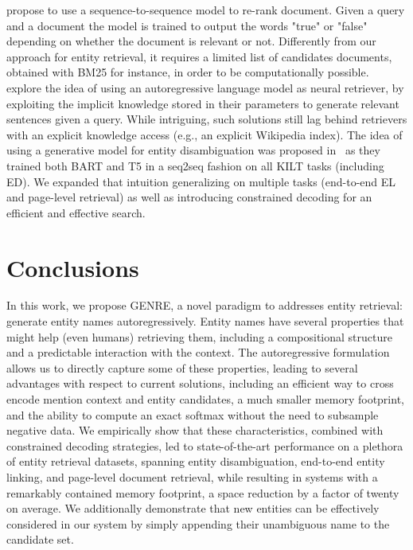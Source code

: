 \documentclass{article} \usepackage{main,times}
\makeatletter
\def\genre{\textsc{GENRE}\@\xspace}
\makeatother
\begin{document}
 \cite{nogueira2020document} propose to use a sequence-to-sequence model to re-rank document. Given a query and a document the model is trained to output the words "true" or "false" depending on whether the document is relevant or not. Differently from our approach for entity retrieval, it requires a limited list of candidates documents, obtained with BM25 for instance, in order to be computationally possible.
 \cite{massarelli2019decoding,petroni2020how} explore the idea of using an autoregressive language
model as neural retriever, by exploiting the implicit knowledge stored in their parameters to generate relevant sentences given a query. While intriguing, such solutions still lag behind retrievers with an explicit knowledge access (e.g., an explicit Wikipedia index).
The idea of using a generative model for entity disambiguation was proposed in~\citet{petroni2020kilt} as they trained both BART and T5 in a seq2seq fashion on all KILT tasks (including ED).  We expanded that intuition generalizing on multiple tasks (end-to-end EL and page-level retrieval) as well as introducing constrained decoding for an efficient and effective search.



 \section{Conclusions}

In this work, we propose \genre, a novel paradigm to addresses entity retrieval: generate entity names autoregressively. 
Entity names have several properties that might help (even humans) retrieving them, including a compositional structure and a predictable interaction with the context. 
The autoregressive formulation allows us to directly capture some of these properties, leading to several advantages with respect to current solutions, including an efficient way to cross encode mention context and entity candidates, a much smaller memory footprint, and the ability to compute an exact softmax without the need to subsample negative data. We empirically show that these characteristics, combined with constrained decoding strategies, led to state-of-the-art performance on a plethora of entity retrieval datasets, spanning entity disambiguation, end-to-end entity linking, and page-level document retrieval, while resulting in systems with a remarkably contained memory footprint, a space reduction by a factor of twenty on average. We additionally demonstrate that new entities can be effectively considered in our system by simply appending their unambiguous name to the candidate set.
\end{document}
